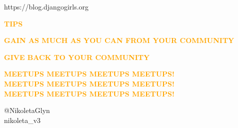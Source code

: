 \documentclass{beamer}
\begin{document}
\begin{frame}
    \begin{center}
    https://blog.djangogirls.org
    \end{center}
\end{frame}

\begin{frame}
    \begin{center}
    \textbf{\textcolor{orange}{TIPS}}
    \end{center}
\end{frame}

\begin{frame}
    \begin{center}
        \textbf{\textcolor{orange}{GAIN AS MUCH AS YOU CAN FROM YOUR COMMUNITY}}
    \end{center}
\end{frame}

\begin{frame}
    \begin{center}
        \textbf{\textcolor{orange}{GIVE BACK TO YOUR COMMUNITY}}
    \end{center}
\end{frame}

\begin{frame}
    \begin{center}
        \textbf{\textcolor{orange}{MEETUPS MEETUPS MEETUPS MEETUPS!}} \\
        \textbf{\textcolor{orange}{MEETUPS MEETUPS MEETUPS MEETUPS!}} \\
        \textbf{\textcolor{orange}{MEETUPS MEETUPS MEETUPS MEETUPS!}} \\
    \end{center}
\end{frame}

\begin{frame}
    \begin{center}
    @NikoletaGlyn \\
    nikoleta\_v3
    \end{center}
\end{frame}
\end{document}

